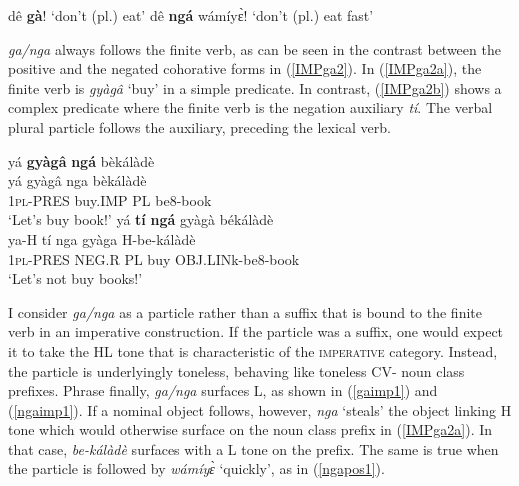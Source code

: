 \begin{exe}
\ex\label{IMPga}
\begin{xlist}
\ex\label{IMPgaa} dê {\bfseries gà}! `don't (pl.) eat'
\ex dê {\bfseries ngá} wámíyɛ̀! `don't (pl.) eat fast'
\end{xlist}
\end{exe}

{\itshape ga/nga} always follows the finite verb, as can be seen in the contrast between the positive and the negated cohorative forms in (\ref{IMPga2}). In (\ref{IMPga2a}), the finite verb is {\itshape gyàgâ} `buy' in a simple predicate. In contrast, (\ref{IMPga2b}) shows a complex predicate where the finite verb is the negation auxiliary {\itshape tí}. The verbal plural particle follows the auxiliary, preceding the lexical verb.

\begin{exe} 
\ex\label{IMPga2}
\begin{xlist}
\ex\label{IMPga2a}
  \glll  yá {\bfseries gyàgâ} {\bfseries ngá} bèkálàdè \\
        yá gyàgâ nga bèkálàdè \\
           1\textsc{pl}-PRES buy.IMP PL be8-book  \\
    \trans `Let's buy book!'
\ex\label{IMPga2b}
  \glll  yá {\bfseries tí} {\bfseries ngá} gyàgà békálàdè \\
        ya-H tí nga gyàga H-be-kálàdè \\
           1\textsc{pl}-PRES NEG.R PL buy OBJ.LINk-be8-book \\
    \trans `Let's not buy books!'
\end{xlist}
\end{exe}

I consider {\itshape ga/nga} as a particle rather than a suffix that is bound to the finite verb in an imperative construction. If the particle was a suffix, one would expect it to take the HL tone that is characteristic of the \textsc{imperative} category. Instead, the particle is underlyingly toneless, behaving like toneless CV- noun class prefixes. Phrase finally, {\itshape ga/nga} surfaces L, as shown in (\ref{gaimp1}) and (\ref{ngaimp1}). If a nominal object follows, however,  {\itshape nga} `steals' the object linking H tone which would otherwise surface on the noun class prefix in (\ref{IMPga2a}). In that case, {\itshape be-kálàdè} surfaces with a L tone on the prefix. 
The same is true when the particle is followed by {\itshape wámíyɛ̀} `quickly', as in (\ref{ngapos1}).


